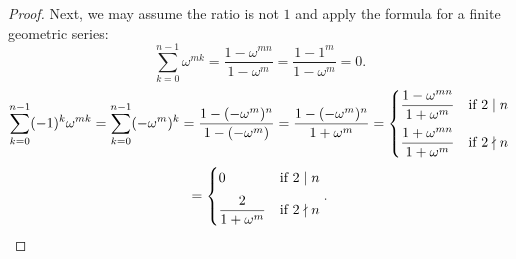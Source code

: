 \documentclass[10pt]{article}
\begin{document}
\begin{enumerate}
\begin{proof}
Next, we may assume the ratio is not $1$ and apply the formula for a finite geometric series:
$$
\sum\limits_{k=0}^{n-1} \omega^{mk} = \frac{1 - \omega^{mn}}{1 - \omega^m}
=
\frac{1 - 1^m}{1 - \omega^m}
= 0.
$$
$$
\sum\limits_{k=0}^{n-1} (-1)^k \omega^{mk}
=
\sum\limits_{k=0}^{n-1} (-\omega^m)^k
=
\frac{1 - (-\omega^m)^n}{1 -(- \omega^m)}
=
\dfrac{1 - (-\omega^m)^n}{1 + \omega^m}
=
\begin{cases}
\dfrac{1 - \omega^{mn}}{1 + \omega^m} & \text{if } 2 \mid n
\vspace{.2cm} \\
\dfrac{1 + \omega^{mn}}{1 + \omega^m} & \text{if } 2 \nmid n
\end{cases}
$$
$$
=
\begin{cases}
0 & \text{if } 2 \mid n
\vspace{.2cm} \\
\dfrac{2}{1 + \omega^m} & \text{if } 2 \nmid n
\end{cases}.
$$
\begin{comment}
If $n$ divides $m$, then $\omega^m = e^{\frac{2m\pi i}{n}} = e^{2 t \pi i}$ for some integer $t$.  Thus, $\omega^m = 1$, and we have that $\sum\limits_{k=0}^{n-1} \omega^{mk} = \sum\limits_{k=0}^{n-1} 1^k = n$, and $\sum\limits_{k=0}^{n-1} (-1)^k \omega^{mk} = \sum\limits_{k=0}^{n-1} (-1)^k$ equals 1 if $n$ is odd and $0$ if $n$ is even.


\end{comment}
\end{proof}
\end{enumerate}
\end{document}
